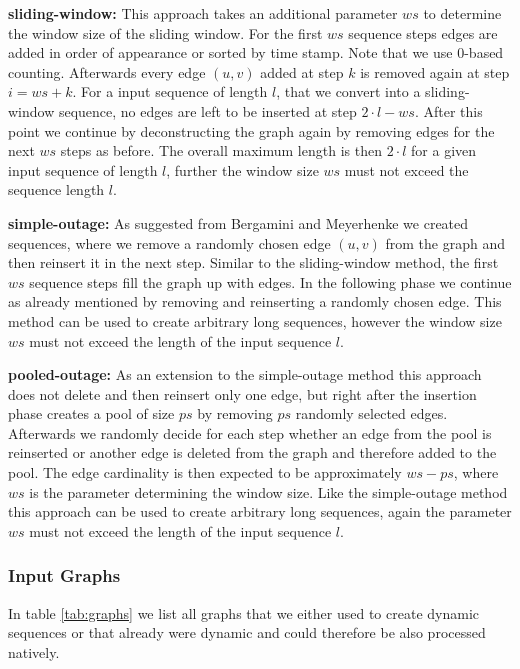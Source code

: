 \documentclass{article}      %
\begin{document}
\bigskip \noindent
\textbf{sliding-window:} This approach takes an additional parameter $ws$ to determine the window size of the sliding window. For the first $ws$ sequence steps edges are added in order of appearance or sorted by time stamp. Note that we use $0$-based counting. Afterwards every edge $(u,v)$ added at step $k$ is removed again at step $i=ws+k$. For a input sequence of length $l$, that we convert into a sliding-window sequence, no edges are left to be inserted at step $2 \cdot l - ws$. After this point we continue by deconstructing the graph again by removing edges for the next $ws$ steps as before. The overall maximum length is then $2 \cdot l$ for a given input sequence of length $l$, further the window size $ws$ must not exceed the sequence length $l$.

\bigskip \noindent
\textbf{simple-outage:} As suggested from Bergamini and Meyerhenke we created sequences, where we remove a randomly chosen edge $(u,v)$ from the graph and then reinsert it in the next step. Similar to the sliding-window method, the first $ws$ sequence steps fill the graph up with edges. In the following phase we continue as already mentioned by removing and reinserting a randomly chosen edge. This method can be used to create arbitrary long sequences, however the window size $ws$ must not exceed the length of the input sequence $l$.

\bigskip \noindent
\textbf{pooled-outage:} As an extension to the simple-outage method this approach does not delete and then reinsert only one edge, but right after the insertion phase creates a pool of size $ps$ by removing $ps$ randomly selected edges. Afterwards we randomly decide for each step whether an edge from the pool is reinserted or another edge is deleted from the graph and therefore added to the pool. The edge cardinality is then expected to be approximately $ws-ps$, where $ws$ is the parameter determining the window size. Like the simple-outage method this approach can be used to create arbitrary long sequences, again the parameter $ws$ must not exceed the length of the input sequence $l$.

\subsubsection{Input Graphs}
\label{sec:in-graphs}

In table \ref{tab:graphs} we list all graphs that we either used to create dynamic sequences or that already were dynamic and could therefore be also processed natively.
\end{document}
